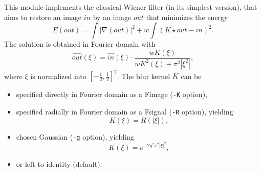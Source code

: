 This module implements the classical Wiener filter 
(in its simplest version),
that aims to restore an image $in$ by an image $out$ that minimizes the energy
$$E(out) = \int |\nabla(out)|^2 +  w \int (K \star out -in)^2.$$
The solution is obtained in Fourier domain with
$$\widehat{out}(\xi) = \widehat{in}(\xi) \cdot
\frac{w K(\xi)}{w K^2(\xi) + \pi^2|\xi^2|},$$
where $\xi$ is normalized into $[-\frac 12,\frac 12]^2$.
The blur kernel $K$ can be 
\begin{itemize}
\item specified directly in Fourier domain as a Fimage (\verb+-K+ option), 
\item specified radially in Fourier domain as a Fsignal (\verb+-R+ option), yielding
$$K(\xi) = R(|\xi|),$$
\item chosen Gaussian (\verb+-g+ option), yielding
$$K(\xi) = e^{-2g^2\pi^2|\xi|^2},$$ 
\item or left to identity (default).
\end{itemize}
